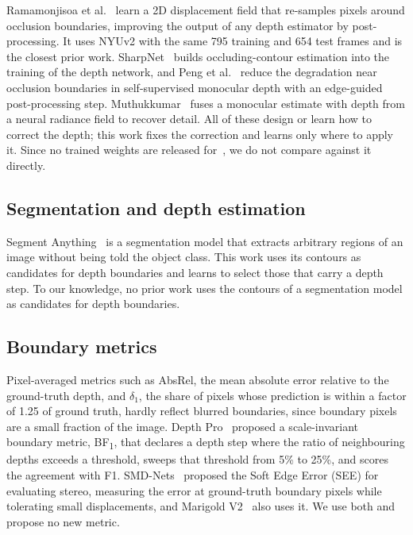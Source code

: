 \documentclass[conference]{IEEEtran}
\newcommand{\bfone}{BF\textsubscript{1}}
\begin{document}
Ramamonjisoa et al.~\cite{ramamonjisoa} learn a 2D displacement field that
re-samples pixels around occlusion boundaries, improving the output of any depth
estimator by post-processing. It uses NYUv2 with the same 795 training and 654
test frames and is the closest prior work. SharpNet~\cite{sharpnet} builds
occluding-contour estimation into the training of the depth network, and Peng
et al.~\cite{edgeguided} reduce the degradation near occlusion boundaries in
self-supervised monocular depth with an edge-guided post-processing step.
Muthukkumar~\cite{nerfrefine} fuses a monocular estimate with depth from a neural
radiance field to recover detail. All of these design or learn how to correct the
depth; this work fixes the correction and learns only where to apply it. Since no
trained weights are released for~\cite{ramamonjisoa}, we do not compare against
it directly.

\subsection{Segmentation and depth estimation}

Segment Anything~\cite{sam} is a segmentation model that extracts arbitrary
regions of an image without being told the object class. This work uses its
contours as candidates
for depth boundaries and learns to select those that carry a depth step. To our
knowledge, no prior work uses the contours of a segmentation model as candidates
for depth boundaries.

\subsection{Boundary metrics}

Pixel-averaged metrics such as AbsRel, the mean absolute error relative to the
ground-truth depth, and $\delta_1$, the share of pixels whose prediction is
within a factor of 1.25 of ground truth, hardly reflect blurred boundaries, since boundary pixels are a small fraction of the image. Depth
Pro~\cite{depthpro} proposed a scale-invariant boundary metric, \bfone{}, that
declares a depth step where the ratio of neighbouring depths exceeds a threshold,
sweeps that threshold from 5\% to 25\%, and scores the agreement with F1.
SMD-Nets~\cite{smdnets} proposed the Soft Edge Error (SEE) for evaluating stereo,
measuring the error at ground-truth boundary pixels while tolerating small
displacements, and Marigold V2~\cite{marigoldv2} also uses it. We use both and
propose no new metric.
\end{document}
